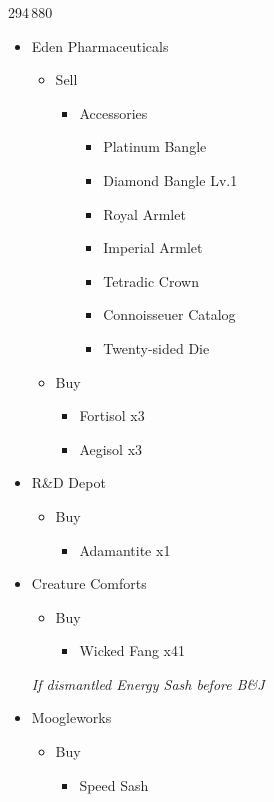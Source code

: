 \begin{shop}{294\,880}
	\begin{itemize}
		\item Eden Pharmaceuticals
			\begin{itemize}
				\item Sell
					\begin{itemize}
						\item Accessories
							\begin{itemize}
								\item Platinum Bangle
								\item Diamond Bangle Lv.1
								\item Royal Armlet
								\item Imperial Armlet
								\item Tetradic Crown
								\item Connoisseuer Catalog
								\item Twenty-sided Die
							\end{itemize}
					\end{itemize}
				\item Buy
					\begin{itemize}
						\item Fortisol x3
						\item Aegisol x3
					\end{itemize}
			\end{itemize}	
		\item R\&D Depot
			\begin{itemize}
				\item Buy
					\begin{itemize}
						\item Adamantite x1
					\end{itemize}
			\end{itemize}
		\item Creature Comforts
			\begin{itemize}
				\item Buy
					\begin{itemize}
						\item Wicked Fang x41
					\end{itemize}
			\end{itemize}
		\textit{If dismantled Energy Sash before B\&J}
		\item Moogleworks
			\begin{itemize}
				\item Buy
					\begin{itemize}
						\item Speed Sash
					\end{itemize}
			\end{itemize}
	\end{itemize}
\end{shop}


